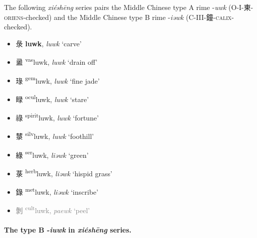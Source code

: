 The following \textit{xiéshēng} series pairs the Middle Chinese type A rime 
-\textit{uwk} (O-I-東-\textsc{oriens}-checked)
and the Middle Chinese type B
rime -\textit{iəwk}
(C-III-鐘-\textsc{calix}-checked). 

\begin{itemize}
    \item {\Large{彔}} %
    {\large{\textbf{luwk}}},
    \textit{luwk} `carve' %

    \item {\Large{盝}} %
    {\large{{\textsuperscript{vas}}luwk}},
    \textit{luwk} `drain off' %

    \item {\Large{琭}} %
    {\large{{\textsuperscript{gem}}luwk}},
    \textit{luwk} `fine jade' %

    \item {\Large{睩}} %
    {\large{{\textsuperscript{ocul}}luwk}},
    \textit{luwk} `stare' %

    \item {\Large{祿}} %
    {\large{{\textsuperscript{spirit}}luwk}},
    \textit{luwk} `fortune' %

    \item {\Large{㯟}} %
    {\large{{\textsuperscript{silv}}luwk}},
    \textit{luwk} `foothill' %

    \item {\Large{綠}} %
    {\large{{\textsuperscript{ser}}luwk}},
    \textit{liəwk} `green' %

    \item {\Large{菉}} %
    {\large{{\textsuperscript{herb}}luwk}},
    \textit{liəwk} `hispid grass' %

    \item {\Large{錄}} %
    {\large{{\textsuperscript{met}}luwk}},
    \textit{liəwk} `inscribe' %

    \item  \textcolor{gray}{{\Large{剝}} %
    {\large{{\textsuperscript{cult}}luwk}},
    \textit{paewk} `peel'} %
\end{itemize}


\paragraph{The type B -\textit{iuwk} in \textit{xiéshēng} series.}
\label{par:iuwk-XS}

